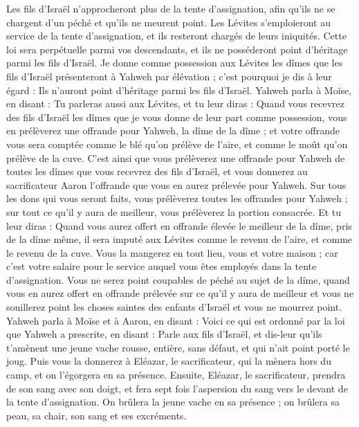 \begin{multicols}{2}
Les fils d'Israël n'approcheront plus de la tente d'assignation, afin qu'ils ne se chargent d'un péché et qu'ils ne meurent point.
Les Lévites s'emploieront au service de la tente d'assignation, et ils resteront chargés de leurs iniquités. Cette loi sera perpétuelle parmi vos descendants, et ils ne posséderont point d'héritage parmi les fils d'Israël.
Je donne comme possession aux Lévites les dîmes que les fils d'Israël présenteront à Yahweh par élévation ; c'est pourquoi je dis à leur égard : Ils n'auront point d'héritage parmi les fils d'Israël.
Yahweh parla à Moïse, en disant :
Tu parleras aussi aux Lévites, et tu leur diras : Quand vous recevrez des fils d'Israël les dîmes que je vous donne de leur part comme possession, vous en prélèverez une offrande pour Yahweh, la dîme de la dîme ;
et votre offrande vous sera comptée comme le blé qu'on prélève de l'aire, et comme le moût qu'on prélève de la cuve.
C'est ainsi que vous prélèverez une offrande pour Yahweh de toutes les dîmes que vous recevrez des fils d'Israël, et vous donnerez au sacrificateur Aaron l'offrande que vous en aurez prélevée pour Yahweh.
Sur tous les dons qui vous seront faits, vous prélèverez toutes les offrandes pour Yahweh ; sur tout ce qu'il y aura de meilleur, vous prélèverez la portion consacrée.
Et tu leur diras : Quand vous aurez offert en offrande élevée le meilleur de la dîme, pris de la dîme même, il sera imputé aux Lévites comme le revenu de l'aire, et comme le revenu de la cuve.
Vous la mangerez en tout lieu, vous et votre maison ; car c'est votre salaire pour le service auquel vous êtes employés dans la tente d'assignation.
Vous ne serez point coupables de péché au sujet de la dîme, quand vous en aurez offert en offrande prélevée sur ce qu'il y aura de meilleur et vous ne souillerez point les choses saintes des enfants d'Israël et vous ne mourrez point.
\VerseOne{}Yahweh parla à Moïse et à Aaron, en disant :
Voici ce qui est ordonné par la loi que Yahweh a prescrite, en disant : Parle aux fils d'Israël, et dis-leur qu'ils t'amènent une jeune vache rousse, entière, sans défaut, et qui n'ait point porté le joug.
Puis vous la donnerez à Eléazar, le sacrificateur, qui la mènera hors du camp, et on l'égorgera en sa présence.
Ensuite, Eléazar, le sacrificateur, prendra de son sang avec son doigt, et fera sept fois l'aspersion du sang vers le devant de la tente d'assignation.
On brûlera la jeune vache en sa présence ; on brûlera sa peau, sa chair, son sang et ses excréments.

\end{multicols}
